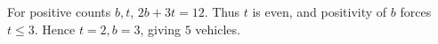 For positive counts $b,t$, $2b+3t=12$. Thus $t$ is even, and positivity of $b$ forces $t\le3$. Hence $t=2,b=3$, giving $\boxed5$ vehicles.
